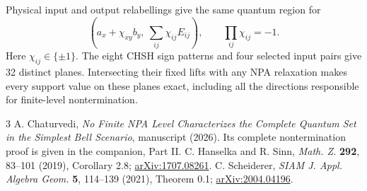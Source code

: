 \documentclass[11pt,twocolumn]{article}
\begin{document}
Physical input and output relabellings give the same quantum region for
\[
 \left(a_x+\chi_{xy}b_y,\ \sum_{ij}\chi_{ij}E_{ij}\right),
 \qquad \prod_{ij}\chi_{ij}=-1.
\]
Here $\chi_{ij}\in\{\pm1\}$. The eight CHSH sign patterns and four selected input pairs give
32 distinct planes. Intersecting their fixed lifts with any NPA
relaxation makes every support value on these planes exact, including
all the directions responsible for finite-level nontermination.

\begin{thebibliography}{3}\setlength{\itemsep}{0pt}
 A. Chaturvedi, \emph{No Finite NPA Level Characterizes
the Complete Quantum Set in the Simplest Bell Scenario}, manuscript (2026). Its complete nontermination proof is
given in the companion, Part II.
 C. Hanselka and R. Sinn, \emph{Math. Z.} \textbf{292},
83--101 (2019), Corollary 2.8;
\href{https://arxiv.org/abs/1707.08261}{arXiv:1707.08261}.
 C. Scheiderer, \emph{SIAM J. Appl. Algebra Geom.}
\textbf{5}, 114--139 (2021), Theorem 0.1;
\href{https://arxiv.org/abs/2004.04196}{arXiv:2004.04196}.
\end{thebibliography}
\end{document}
